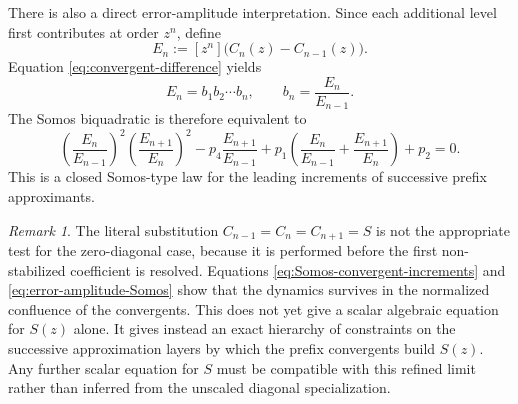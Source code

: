 \documentclass[11pt]{article}
\theoremstyle{remark}
\newtheorem{remark}[theorem]{Remark}
\begin{document}
There is also a direct error-amplitude interpretation.  Since each additional
level first contributes at order $z^n$, define
\begin{equation}
 E_n:=[z^n]\bigl(C_n(z)-C_{n-1}(z)\bigr).
 \label{eq:error-amplitude}
\end{equation}
Equation \eqref{eq:convergent-difference} yields
\begin{equation}
 E_n=b_1b_2\cdots b_n,
 \qquad b_n=\frac{E_n}{E_{n-1}}.
 \label{eq:error-amplitude-product}
\end{equation}
The Somos biquadratic is therefore equivalent to
\begin{equation}
 \left(\frac{E_n}{E_{n-1}}\right)^2
 \left(\frac{E_{n+1}}{E_n}\right)^2
 -p_4\frac{E_{n+1}}{E_{n-1}}
 +p_1\left(\frac{E_n}{E_{n-1}}+
 \frac{E_{n+1}}{E_n}\right)+p_2=0.
 \label{eq:error-amplitude-Somos}
\end{equation}
This is a closed Somos-type law for the leading increments of successive
prefix approximants.

\begin{remark}
The literal substitution $C_{n-1}=C_n=C_{n+1}=S$ is not the appropriate test
for the zero-diagonal case, because it is performed before the first
non-stabilized coefficient is resolved.  Equations
\eqref{eq:Somos-convergent-increments} and
\eqref{eq:error-amplitude-Somos} show that the dynamics survives in the
normalized confluence of the convergents.  This does not yet give a scalar
algebraic equation for $S(z)$ alone.  It gives instead an exact hierarchy of
constraints on the successive approximation layers by which the prefix
convergents build $S(z)$.  Any further scalar equation for $S$ must be
compatible with this refined limit rather than inferred from the unscaled
diagonal specialization.
\end{remark}
\end{document}

